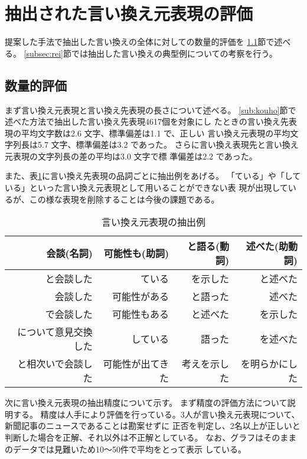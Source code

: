 \documentclass[jnlpbbl]{jnlp_j}
\begin{document}
\section{抽出された言い換え元表現の評価}\label{sec:hyouka}

提案した手法で抽出した言い換えの全体に対しての数量的評価を
\ref{subsec:suuryou}節で述べる。
\ref{subsec:rei}節では抽出した言い換えの典型例についての考察を行う。

\subsection{数量的評価} \label{subsec:suuryou} 

まず言い換え元表現と言い換え先表現の長さについて述べる。
\ref{sub:kouho}節で述べた方法で抽出した言い換え先表現4617個を対象にし
たときの言い換え先表現の平均文字数は2.6 文字、標準偏差は1.1 で、正しい
言い換え元表現の平均文字列長は5.7 文字、標準偏差は3.2 であった。 
さらに言い換え表現先と言い換え元表現の文字列長の差の平均は3.0 文字で標
準偏差は2.2 であった。

また、表\ref{hyougen-rei}に言い換え先表現の品詞ごとに抽出例をあげる。
「ている」や「している」といった言い換え元表現として用いることができない表
現が出現しているが、この様な表現を削除することは今後の課題である。

\begin{table}[htb]
\caption{言い換え元表現の抽出例}
\label{hyougen-rei}
\begin{center}
\begin{tabular}{|r|r|r|r|} \hline
会談(名詞) & 可能性も(助詞) & と語る(動詞) & 述べた(助動詞) \\\hline\hline
と会談した & ている & を示した & と述べた \\\hline
会談した   & 可能性がある & と語った & 述べた \\\hline
で会談した & 可能性もある & と述べた & を示した \\\hline
について意見交換した & している & 語った & を述べた \\\hline
と相次いで会談した & 可能性が出てきた & 考えを示した & を明らかにした \\\hline

\end{tabular}
\end{center}
\end{table}

次に言い換え元表現の抽出精度について示す。
まず精度の評価方法について説明する。
精度は人手により評価を行っている。3人が言い換え元表現について、
新聞記事のニュースであることは勘案せずに
正否を判定し、2名以上が正しいと判断した場合を正解、それ以外は不正解としている。
なお、グラフはそのままのデータでは見難いため10〜50件で平均をとって表示
している。
\end{document}
